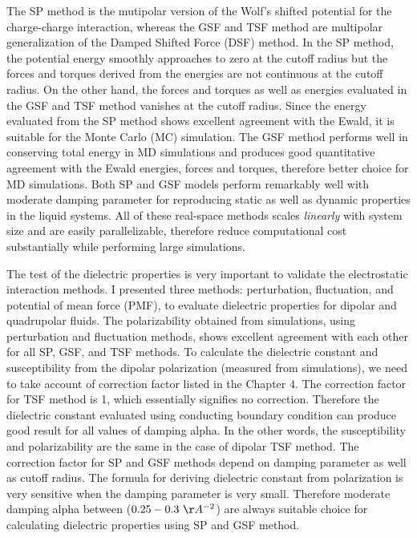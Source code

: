 The SP method is the mutipolar version of the Wolf's shifted potential for the charge-charge interaction, whereas the GSF and TSF method are multipolar generalization of the Damped Shifted Force (DSF) method. In the SP method, the potential energy smoothly approaches to zero at the cutoff radius but the forces and torques derived from the energies are not continuous at the cutoff radius. On the other hand, the forces and torques as well as energies evaluated in the GSF and TSF method vanishes at the cutoff radius. Since the energy evaluated from the SP method shows excellent agreement with the Ewald, it is suitable for the Monte Carlo (MC) simulation. The GSF method performs well in conserving total energy in MD simulations and produces good quantitative agreement with the Ewald energies, forces and torques, therefore better choice for MD simulations. Both SP and GSF models perform remarkably well with moderate damping parameter for reproducing static as well as dynamic properties in the liquid systems. All of these real-space methods scales \textit{linearly} with system size and are easily parallelizable, therefore reduce computational cost substantially while performing large simulations.         

The test of the dielectric properties is very important to validate the electrostatic interaction methods. I presented three methods: perturbation, fluctuation, and potential of mean force (PMF), to evaluate dielectric properties for dipolar and quadrupolar fluids. The polarizability obtained from simulations, using perturbation and fluctuation methods, shows excellent agreement with each other for all SP, GSF, and TSF methods. To calculate the dielectric constant and susceptibility from the dipolar polarization (measured from simulations), we need to take account of correction factor listed in the Chapter 4. The correction factor for TSF method is 1, which essentially signifies no correction. Therefore the dielectric constant evaluated using conducting boundary condition can produce good result for all values of damping alpha. In the other words, the susceptibility and polarizability are the same in the case of dipolar TSF method. The correction factor for SP and GSF methods depend on damping parameter as well as cutoff radius. The formula for deriving dielectric constant from polarization is very sensitive when the damping parameter is very small. Therefore moderate damping alpha between ($0.25 - 0.3~\AA^{-2}$) are always suitable choice for calculating dielectric properties using SP and GSF method.

